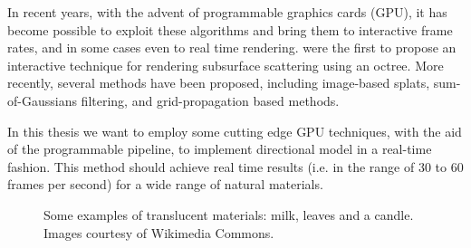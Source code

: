 \documentclass[12pt, twoside,a4paper]{article}
\begin{document}
In recent years, with the advent of programmable graphics cards (GPU), it has become possible to exploit these algorithms and bring them to interactive frame rates, and in some cases even to real time rendering. \cite{Jensen:2002:RHR:566654.566619} were the first to propose an interactive technique for rendering subsurface scattering using an octree. More recently, several methods have been proposed, including image-based splats, sum-of-Gaussians filtering, and grid-propagation based methods.

In this thesis we want to employ some cutting edge GPU techniques, with the aid of the programmable pipeline, to implement \citeauthor{IMM2013-06646} directional model in a real-time fashion. This method should achieve real time results (i.e. in the range of 30 to 60 frames per second) for a wide range of natural materials.

\begin{figure}
\centering
{}
\caption{Some examples of translucent materials: milk, leaves and a candle. Images courtesy of Wikimedia Commons.}
\label{fig:ex1}
\end{figure}
\FloatBarrier



\end{document}
